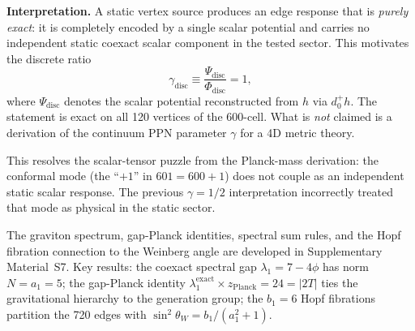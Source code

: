 \documentclass[12pt,a4paper]{article}
\theoremstyle{definition}
\begin{document}
\textbf{Interpretation.}  A static vertex source produces an edge response that
is \emph{purely exact}: it is completely encoded by a single scalar potential
and carries no independent static coexact scalar component in the tested
sector.  This motivates the discrete ratio
\begin{equation}
\gamma_{\mathrm{disc}} \equiv \frac{\Psi_{\mathrm{disc}}}{\Phi_{\mathrm{disc}}}
= 1,
\end{equation}
where $\Psi_{\mathrm{disc}}$ denotes the scalar potential reconstructed from
$h$ via $d_0^+ h$.  The statement is exact on all 120 vertices of the 600-cell.
What is \emph{not} claimed is a derivation of the continuum PPN parameter
$\gamma$ for a 4D metric theory.

This resolves the scalar-tensor puzzle from the Planck-mass derivation: the
conformal mode (the ``$+1$'' in $601 = 600 + 1$) does not couple as an
independent static scalar response.  The previous $\gamma = 1/2$ interpretation
incorrectly treated that mode as physical in the static sector.

The graviton spectrum, gap-Planck identities, spectral sum rules, and the Hopf fibration connection to the Weinberg angle are developed in Supplementary Material~S7.  Key results: the coexact spectral gap $\lambda_1 = 7 - 4\phi$ has norm $N = a_1 = 5$; the gap-Planck identity $\lambda_1^{\text{exact}} \times z_{\text{Planck}} = 24 = |2T|$ ties the gravitational hierarchy to the generation group; the $b_1 = 6$ Hopf fibrations partition the 720 edges with $\sin^2\theta_W = b_1/(a_1^2+1)$.
\end{document}
